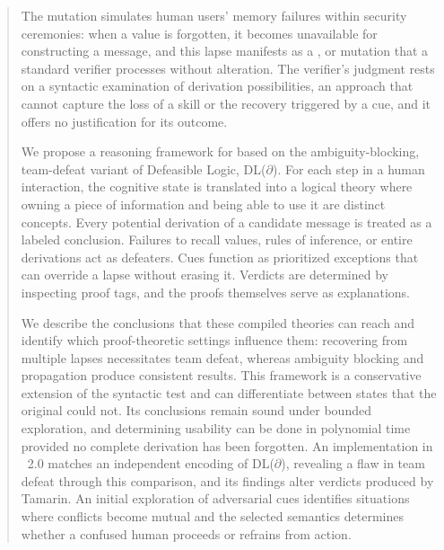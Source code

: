 \begin{abstract}
The \forget{} mutation simulates human users' memory failures within security ceremonies: when a value is forgotten, it becomes unavailable for constructing a message, and this lapse manifests as a \replace{}, \skipm{} or \neglect{} mutation that a standard verifier processes without alteration. The verifier's judgment rests on a syntactic examination of derivation possibilities, an approach that cannot capture the loss of a skill or the recovery triggered by a cue, and it offers no justification for its outcome.

We propose a reasoning framework for \forget{} based on the ambiguity-blocking, team-defeat variant of Defeasible Logic, DL($\partial$). For each step in a human interaction, the cognitive state is translated into a logical theory where owning a piece of information and being able to use it are distinct concepts. Every potential derivation of a candidate message is treated as a labeled conclusion. Failures to recall values, rules of inference, or entire derivations act as defeaters. Cues function as prioritized exceptions that can override a lapse without erasing it. Verdicts are determined by inspecting proof tags, and the proofs themselves serve as explanations.

We describe the conclusions that these compiled theories can reach and identify which proof-theoretic settings influence them: recovering from multiple lapses necessitates team defeat, whereas ambiguity blocking and propagation produce consistent results. This framework is a conservative extension of the syntactic test and can differentiate between states that the original could not. Its conclusions remain sound under bounded exploration, and determining usability can be done in polynomial time provided no complete derivation has been forgotten. An implementation in \XMen~2.0 matches an independent encoding of DL($\partial$), revealing a flaw in team defeat through this comparison, and its findings alter verdicts produced by Tamarin. An initial exploration of adversarial cues identifies situations where conflicts become mutual and the selected semantics determines whether a confused human proceeds or refrains from action.
\end{abstract}
